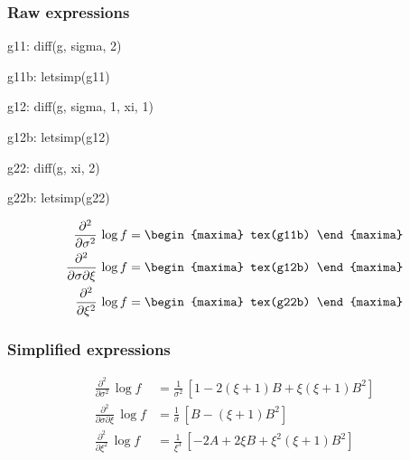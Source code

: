 \subsubsection*{Raw expressions} 
 
 \begin{maxima}
   g11: diff(g, sigma, 2)
 \end{maxima}%
 \begin{maxima}
   g11b: letsimp(g11)
 \end{maxima}%
 
 \begin{maxima}
   g12: diff(g, sigma, 1, xi, 1)
 \end{maxima}%
 
 \begin{maxima}
   g12b: letsimp(g12)
 \end{maxima}%
 
 \begin{maxima}
   g22: diff(g, xi, 2)
 \end{maxima}%
 
 \begin{maxima}
   g22b: letsimp(g22)
 \end{maxima}%
 
{\color{MonVertF}  
\begin{align*}
  \frac{\partial^2}{\partial \sigma^2} \,\log f
  &= 
   \begin{maxima}
     tex(g11b)
   \end{maxima} \\
  \frac{\partial^2}{\partial \sigma \partial \xi} \, \log f
  &=
    \begin{maxima}
      tex(g12b)
    \end{maxima}\\
  \frac{\partial^2}{\partial \xi^2}\, \log f
  &=
    \begin{maxima}
      tex(g22b)
    \end{maxima}
\end{align*}
}

\subsubsection*{Simplified  expressions}

{\color{red}
\begin{align*}
  \frac{\partial^2}{\partial \sigma^2} \,\log f
  &= \frac{1}{\sigma^2}\, \left[ 1 - 2 (\xi + 1) B + \xi (\xi + 1) B^2\right] \\
 \frac{\partial^2}{\partial \sigma \partial \xi} \,\log f 
  &= \frac{1}{\sigma}\, \left[ B - (\xi + 1) B^2\right] \\
    \frac{\partial^2}{\partial \xi^2} \,\log f 
  &= \frac{1}{\xi^3}\, \left[-2 A + 2 \xi  B + \xi^2 (\xi + 1) B^2\right]
\end{align*}
}



